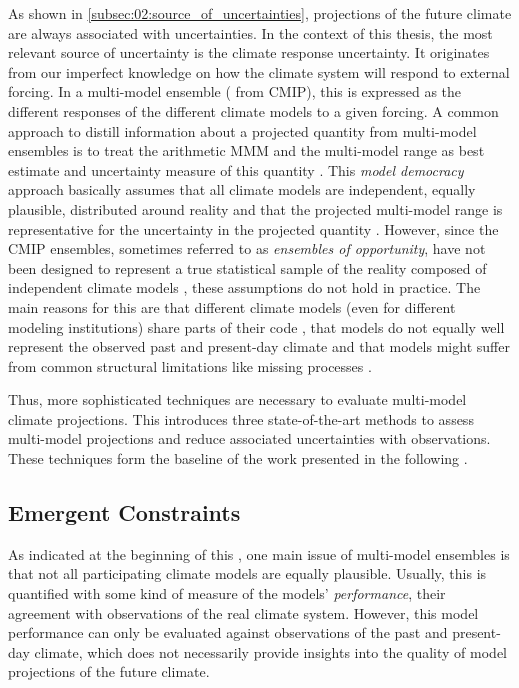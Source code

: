 As shown in \cref{subsec:02:source_of_uncertainties}, projections of the future
climate are always associated with uncertainties. In the context of this
thesis, the most relevant source of uncertainty is the climate response
uncertainty. It originates from our imperfect knowledge on how the climate
system will respond to external forcing. In a multi-model ensemble (\eg{} from
\ac{CMIP}), this is expressed as the different responses of the different
climate models to a given forcing. A common approach to distill information
about a projected quantity from multi-model ensembles is to treat the
arithmetic \ac{MMM} and the multi-model range as best estimate and uncertainty
measure of this quantity \autocite{Collins2013}. This \emph{model democracy}
approach basically assumes that all climate models are independent, equally
plausible, distributed around reality and that the projected multi-model range
is representative for the uncertainty in the projected quantity
\autocite{Knutti2017a}. However, since the \ac{CMIP} ensembles, sometimes
referred to as \emph{ensembles of opportunity}, have not been designed to
represent a true statistical sample of the reality composed of independent
climate models \autocite{Tebaldi2007}, these assumptions do not hold in
practice. The main reasons for this are that different climate models (even for
different modeling institutions) share parts of their code
\autocite{Abramowitz2019, Knutti2013}, that models do not equally well
represent the observed past and present-day climate \autocite{Gleckler2008,
  Knutti2013} and that models might suffer from common structural limitations
like missing processes \autocite{Knutti2017a}.

Thus, more sophisticated techniques are necessary to evaluate multi-model
climate projections. This  introduces
three state-of-the-art methods to assess multi-model projections and reduce
associated uncertainties with observations. These techniques form the baseline
of the work presented in the following .


\subsection{Emergent Constraints}
\label{subsec:02:emergent_constraints}

As indicated at the beginning of this ,
one main issue of multi-model ensembles is that not all participating climate
models are equally plausible. Usually, this is quantified with some kind of
measure of the models' \emph{performance}, \ie{} their agreement with
observations of the real climate system. However, this model performance can
only be evaluated against observations of the past and present-day climate,
which does not necessarily provide insights into the quality of model
projections of the future climate.

